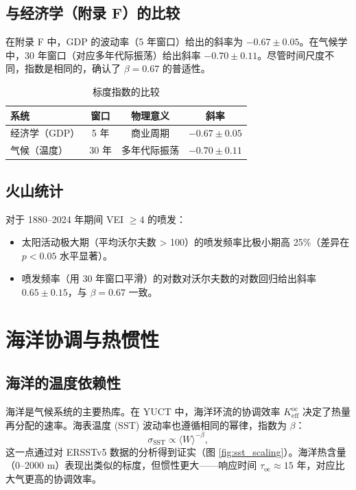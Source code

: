 \documentclass[12pt,a4paper]{article}
\newcommand{\Keff}{K_{\mathrm{eff}}}
\newcommand{\be}{\beta}
\begin{document}
	\subsection{与经济学（附录 F）的比较}
	
	在附录 F 中，GDP 的波动率（5 年窗口）给出的斜率为 \(-0.67 \pm 0.05\)。在气候学中，30 年窗口（对应多年代际振荡）给出斜率 \(-0.70 \pm 0.11\)。尽管时间尺度不同，指数是相同的，确认了 \(\be = 0.67\) 的普适性。
	
	\begin{table}[htbp]
		\centering
		\caption{标度指数的比较}
		\label{tab:compare}
		\begin{tabular}{@{}lccc@{}}
			\toprule
			系统 & 窗口 & 物理意义 & 斜率 \\
			\midrule
			经济学（GDP） & 5 年 & 商业周期 & \(-0.67 \pm 0.05\) \\
			气候（温度） & 30 年 & 多年代际振荡 & \(-0.70 \pm 0.11\) \\
			\bottomrule
		\end{tabular}
	\end{table}
	
	\subsection{火山统计}
	
	对于 1880–2024 年期间 VEI \(\ge 4\) 的喷发：
	\begin{itemize}
		\item 太阳活动极大期（平均沃尔夫数 > 100）的喷发频率比极小期高 25\%（差异在 \(p < 0.05\) 水平显著）。
		\item 喷发频率（用 30 年窗口平滑）的对数对沃尔夫数的对数回归给出斜率 \(0.65 \pm 0.15\)，与 \(\beta = 0.67\) 一致。
	\end{itemize}
	
	\section{海洋协调与热惯性}
	
	\subsection{海洋的温度依赖性}
	
	海洋是气候系统的主要热库。在 YUCT 中，海洋环流的协调效率 \(\Keff^{\text{oc}}\) 决定了热量再分配的速率。海表温度 (SST) 波动率也遵循相同的幂律，指数为 \(\be\)：
	\[
	\sigma_{\text{SST}} \propto \langle W \rangle^{-\be},
	\]
	这一点通过对 ERSSTv5 数据的分析得到证实（图 \ref{fig:sst_scaling}）。海洋热含量（0–2000 m）表现出类似的标度，但惯性更大——响应时间 \(\tau_{\text{oc}} \approx 15\) 年，对应比大气更高的协调效率。
	
\end{document}

